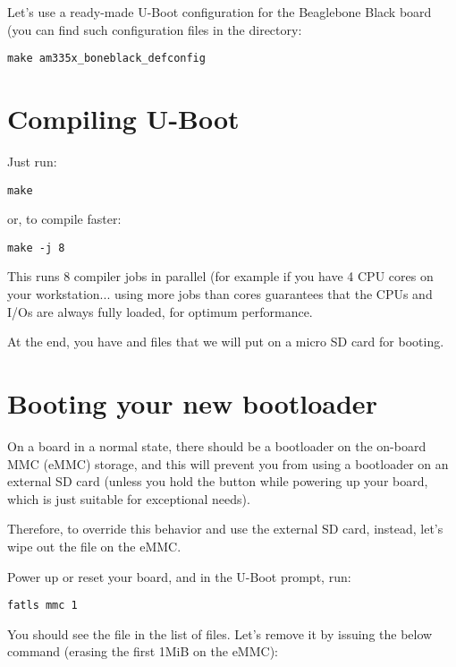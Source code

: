 Let's use a ready-made U-Boot configuration for the Beaglebone Black
board (you can find such configuration files in the 
directory:

\begin{verbatim}
make am335x_boneblack_defconfig
\end{verbatim}

\section{Compiling U-Boot}

Just run:
\begin{verbatim}
make
\end{verbatim}

or, to compile faster:

\begin{verbatim}
make -j 8
\end{verbatim}

This runs 8 compiler jobs in parallel (for example if you have 4 CPU
cores on your workstation... using more jobs than cores guarantees that
the CPUs and I/Os are always fully loaded, for optimum performance.

At the end, you have  and  files that we will
put on a micro SD card for booting.



\section{Booting your new bootloader}

On a board in a normal state, there should be a bootloader on the on-board MMC
(eMMC) storage, and this will prevent you from using a bootloader on an
external SD card (unless you hold the  button while powering
up your board, which is just suitable for exceptional needs).

Therefore, to override this behavior and use the external SD card,
instead, let's wipe out the  file on the eMMC.

Power up or reset your board, and in the U-Boot prompt, run:

\begin{verbatim}
fatls mmc 1
\end{verbatim}

You should see the  file in the list of files. Let's remove it
by issuing the below command (erasing the first 1MiB on the eMMC):

